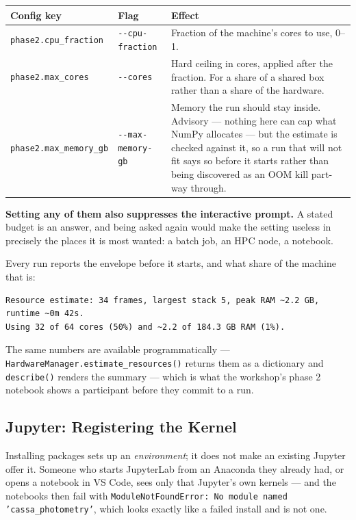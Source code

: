 \documentclass[11pt,a4paper]{article}
\begin{document}
\begin{center}
\begin{tabularx}{\textwidth}{|l|l|X|}
\hline
\textbf{Config key} & \textbf{Flag} & \textbf{Effect} \\
\hline
\texttt{phase2.cpu\_fraction} & \texttt{-{}-cpu-fraction} & Fraction of the machine's cores to use, 0--1. \\
\hline
\texttt{phase2.max\_cores} & \texttt{-{}-cores} & Hard ceiling in cores, applied after the fraction. For a share of a shared box rather than a share of the hardware. \\
\hline
\texttt{phase2.max\_memory\_gb} & \texttt{-{}-max-memory-gb} & Memory the run should stay inside. Advisory --- nothing here can cap what NumPy allocates --- but the estimate is checked against it, so a run that will not fit says so before it starts rather than being discovered as an OOM kill part-way through. \\
\hline
\end{tabularx}
\end{center}

\textbf{Setting any of them also suppresses the interactive prompt.} A stated
budget is an answer, and being asked again would make the setting useless in
precisely the places it is most wanted: a batch job, an HPC node, a notebook.

Every run reports the envelope before it starts, and what share of the machine
that is:

\begin{lstlisting}
Resource estimate: 34 frames, largest stack 5, peak RAM ~2.2 GB, runtime ~0m 42s.
Using 32 of 64 cores (50%) and ~2.2 of 184.3 GB RAM (1%).
\end{lstlisting}

The same numbers are available programmatically ---
\texttt{HardwareManager.estimate\_resources()} returns them as a dictionary and
\texttt{describe()} renders the summary --- which is what the workshop's phase 2
notebook shows a participant before they commit to a run.

\subsection{Jupyter: Registering the Kernel}
Installing packages sets up an \emph{environment}; it does not make an existing
Jupyter offer it. Someone who starts JupyterLab from an Anaconda they already
had, or opens a notebook in VS Code, sees only that Jupyter's own kernels --- and
the notebooks then fail with \texttt{ModuleNotFoundError: No module named
'cassa\_photometry'}, which looks exactly like a failed install and is not one.
\end{document}
